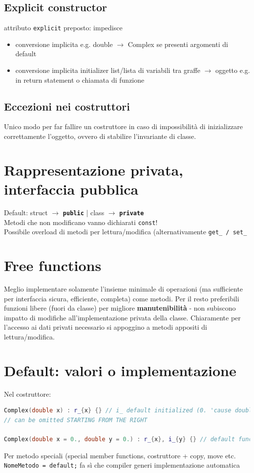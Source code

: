\documentclass[10pt, oneside]{book}
\begin{document}
\subsection{Explicit constructor} attributo \texttt{explicit} preposto: impedisce
\begin{itemize}
\item conversione implicita e.g. double $\rightarrow$ Complex se presenti argomenti di default
\item conversione implicita initializer list/lista di variabili tra graffe $\rightarrow$ oggetto e.g. in return statement o chiamata di funzione
\end{itemize}

\subsection{Eccezioni nei costruttori}
Unico modo per far fallire un costruttore in caso di impossibilità di inizializzare correttamente l'oggetto, ovvero di stabilire l'invariante di classe.


\section{Rappresentazione privata, interfaccia pubblica}
Default: struct $\rightarrow$ \textbf{\texttt{public}} \bigg| class $\rightarrow$ \textbf{\texttt{private}}\\
Metodi che non modificano vanno dichiarati \texttt{const}!\\
Possibile overload di metodi per lettura/modifica (alternativamente \texttt{get\_ / set\_}

\section{Free functions}
Meglio implementare solamente l'insieme minimale di operazioni (ma sufficiente per interfaccia sicura, efficiente, completa) come metodi. Per il resto preferibili funzioni libere (fuori da classe) per migliore \textbf{manutenibilità} - non subiscono impatto di modifiche all'implementazione privata della classe. Chiaramente per l'accesso ai dati privati necessario si appoggino a metodi appositi di lettura/modifica.

\section{Default: valori o implementazione}
Nel costruttore:
\begin{lstlisting}[language=C++]
Complex(double x) : r_{x} {} // i_ default initialized (0. 'cause double)
// can be omitted STARTING FROM THE RIGHT

Complex(double x = 0., double y = 0.) : r_{x}, i_{y} {} // default function arguments
\end{lstlisting}
Per metodo speciali (special member functions, costruttore + copy, move etc. \texttt{NomeMetodo = default;} fa sì che compiler generi implementazione automatica
\end{document}
